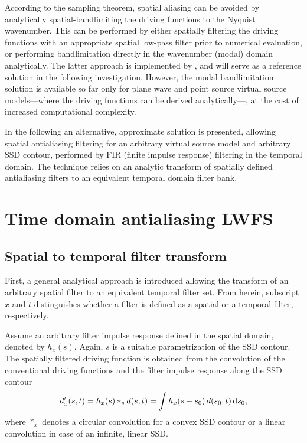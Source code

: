 \documentclass[conference]{IEEEtran}
\begin{document}
According to the sampling theorem, spatial aliasing can be avoided by analytically spatial-bandlimiting the driving functions to the Nyquist wavenumber.
This can be performed by either spatially filtering the driving functions with an appropriate spatial low-pass filter prior to numerical evaluation, or performing bandlimitation directly in the wavenumber (modal) domain analytically.
The latter approach is implemented by \cite{hahn2022cylindrical}, and will serve as a reference solution in the following investigation.
However, the modal bandlimitation solution is available so far only for plane wave and point source virtual source models---where the driving functions can be derived analytically---, at the cost of increased computational complexity.

In the following an alternative, approximate solution is presented, allowing spatial antialiasing filtering for an arbitrary virtual source model and arbitrary SSD contour, performed by FIR (finite impulse response) filtering in the temporal domain.
The technique relies on an analytic transform of spatially defined antialiasing filters to an equivalent temporal domain filter bank.

\section{Time domain antialiasing LWFS}
\label{sec:novel_approach}

\subsection{Spatial to temporal filter transform}
First, a general analytical approach is introduced allowing the transform of an arbitrary spatial filter to an equivalent temporal filter set.
From herein, subscript $x$ and $t$ distinguishes whether a filter is defined as a spatial or a temporal filter, respectively.

Assume an arbitrary filter impulse response defined in the spatial domain, denoted by $h_x(s)$.
Again, $s$ is a suitable parametrization of the SSD contour.
The spatially filtered driving function is obtained from the convolution of the conventional driving functions and the filter impulse response along the SSD contour
\begin{equation}
    d'_x(s,t) = h_x(s) \ast_s d(s,t) = \int h_x(s-s_0) \, d(s_0,t) \, \td s_0,
    \label{eq:spatial_conv}
\end{equation}
where $\ast_x$ denotes a circular convolution for a convex SSD contour or a linear convolution in case of an infinite, linear SSD.
\end{document}
